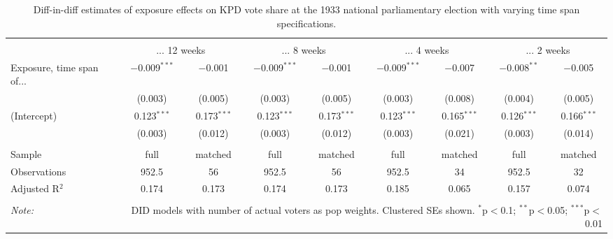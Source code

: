 
\begin{table}[!htbp] \centering 
  \caption{Diff-in-diff estimates of exposure effects on KPD vote share at the 1933 national parliamentary election with varying time span specifications.\vspace{-.25cm}} 
  \label{tab:nsdap-voteshare-kpd-timespan-dd-1933} 
\scriptsize 
\begin{tabular}{@{\extracolsep{5pt}}lcccccccc} 
\\[-1.8ex]\hline 
\hline \\[-1.8ex] 
 & \multicolumn{2}{c}{... 12 weeks} & \multicolumn{2}{c}{... 8 weeks} & \multicolumn{2}{c}{... 4 weeks} & \multicolumn{2}{c}{... 2 weeks} \\ 
 \cmidrule(r){2-3}\cmidrule(r){4-5}\cmidrule(r){6-7}\cmidrule(r){8-9}Exposure, time span of... & $-$0.009$^{***}$ & $-$0.001 & $-$0.009$^{***}$ & $-$0.001 & $-$0.009$^{***}$ & $-$0.007 & $-$0.008$^{**}$ & $-$0.005 \\ 
  & (0.003) & (0.005) & (0.003) & (0.005) & (0.003) & (0.008) & (0.004) & (0.005) \\ 
  (Intercept) & 0.123$^{***}$ & 0.173$^{***}$ & 0.123$^{***}$ & 0.173$^{***}$ & 0.123$^{***}$ & 0.165$^{***}$ & 0.126$^{***}$ & 0.166$^{***}$ \\ 
  & (0.003) & (0.012) & (0.003) & (0.012) & (0.003) & (0.021) & (0.003) & (0.014) \\ 
 \hline \\[-1.8ex] 
Sample & full & matched & full & matched & full & matched & full & matched \\ 
Observations & 952.5 & 56 & 952.5 & 56 & 952.5 & 34 & 952.5 & 32 \\ 
Adjusted R$^{2}$ & 0.174 & 0.173 & 0.174 & 0.173 & 0.185 & 0.065 & 0.157 & 0.074 \\ 
\hline 
\hline \\[-1.8ex] 
\textit{Note:}  & \multicolumn{8}{r}{DID models with number of actual voters as pop weights. Clustered SEs shown. $^{*}$p$<$0.1; $^{**}$p$<$0.05; $^{***}$p$<$0.01} \\ 
\end{tabular} 
\end{table} 
